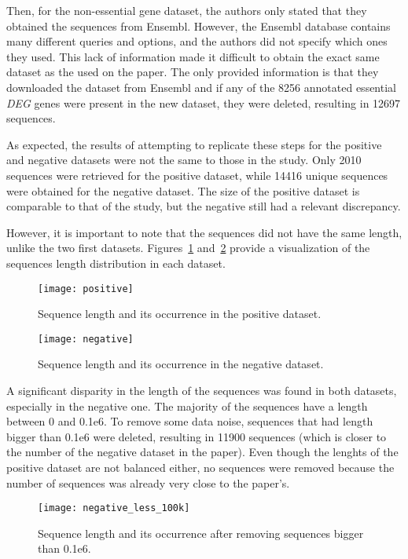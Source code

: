 Then, for the non-essential gene dataset, the authors only stated that they obtained the sequences from Ensembl. However, the Ensembl database contains many different queries and options, and the authors did not specify which ones they used. This lack of information made it difficult to obtain the exact same dataset as the used on the paper. The only provided information is that they downloaded the dataset from Ensembl and if any of the 8256 annotated essential \textit{DEG} genes were present in the new dataset, they were deleted, resulting in 12697 sequences.

As expected, the results of attempting to replicate these steps for the positive and negative datasets were not the same to those in the study. Only 2010 sequences were retrieved for the positive dataset, while 14416 unique sequences were obtained for the negative dataset. The size of the positive dataset is comparable to that of the study, but the negative still had a relevant discrepancy. 

However, it is important to note that the sequences did not have the same length, unlike the two first datasets. Figures~\ref{fig:deg_length} and~\ref{fig:negative}  provide a visualization of the sequences length distribution in each dataset.

\begin{figure}[htbp]
    \centering
    \texttt{[image: positive]}
    \caption{Sequence length and its occurrence in the positive dataset.}
    \label{fig:deg_length}
\end{figure}

\begin{figure}[htbp]
    \centering
    \texttt{[image: negative]}
    \caption{Sequence length and its occurrence in the negative dataset.}
    \label{fig:negative}
\end{figure}

A significant disparity in the length of the sequences was found in both datasets, especially in the negative one. The majority of the sequences have a length between 0 and 0.1e6. To remove some data noise, sequences that had length bigger than 0.1e6 were deleted, resulting in 11900 sequences (which is closer to the number of the negative dataset in the paper). Even though the lenghts of the positive dataset are not balanced either, no sequences were removed because the number of sequences was already very close to the paper's.

\begin{figure}[htbp]
    \centering
    \texttt{[image: negative\_less\_100k]}
    \caption{Sequence length and its occurrence after removing sequences bigger than 0.1e6.}
    \label{fig:negative_less_100k}
\end{figure}

